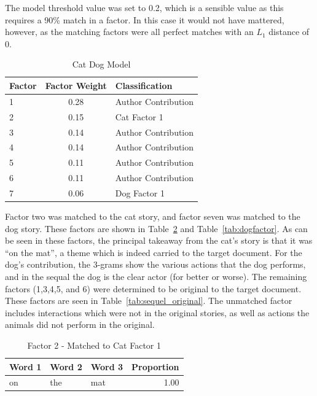 \documentclass[../ut-dissertation.tex]{subfiles}
\begin{document}
The model threshold value was set to 0.2, which is a sensible value as
this requires a 90\% match in a factor.  In this case it would not
have mattered, however, as the matching factors were all perfect
matches with an $L_1$ distance of 0.

\begin{table}[p]
  \centering
  \caption{Cat Dog Model} \label{tab:cat_dog_class}
  \begin{tabular}{|l|c|l|}
    \hline
    Factor & Factor Weight & Classification\\
    \hline
    1 & 0.28 & Author Contribution\\
    2 & 0.15 & Cat Factor 1\\
    3 & 0.14 & Author Contribution\\
    4 & 0.14 & Author Contribution\\
    5 & 0.11 & Author Contribution\\
    6 & 0.11 & Author Contribution\\
    7 & 0.06 & Dog Factor 1\\
    \hline
  \end{tabular}
\end{table}


Factor two was matched to the cat story, and factor seven was matched
to the dog story.  These factors are shown in
Table~\ref{tab:catfactor} and Table~\ref{tab:dogfactor}.  As can be
seen in these factors, the principal takeaway from the cat's story is
that it was ``on the mat'', a theme which is indeed carried to the
target document.  For the dog's contribution, the 3-grams show the
various actions that the dog performs, and in the sequal the dog is
the clear actor (for better or worse). The remaining factors (1,3,4,5,
and 6) were determined to be original to the target document.  These
factors are seen in Table~\ref{tab:sequel_original}.  The unmatched
factor includes interactions which were not in the original stories,
as well as actions the animals did not perform in the original.

\begin{table}[p]
  \centering
  \caption{Factor 2 - Matched to Cat Factor 1}\label{tab:catfactor}
  \begin{tabular}{|lll|r|}
    \hline
    Word 1 & Word 2 & Word 3 & Proportion\\
    \hline
    on & the & mat & 1.00\\
    \hline
  \end{tabular}
\end{table}
\end{document}
